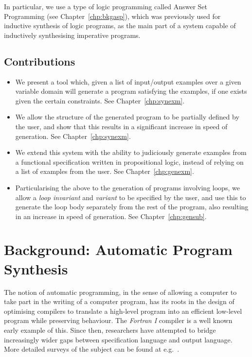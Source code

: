 \documentclass[a4paper,twoside,notitlepage]{report}
\begin{document}
In particular, we use a type of logic programming called Answer Set 
Programming (see Chapter~\ref{chp:bkgasp}), which was previously used for 
inductive synthesis of logic programs, as the main part of a system 
capable of inductively synthesising imperative programs.

\section{Contributions}
\begin{changebar}
\begin{itemize}
    \item We present a tool which, given a list of input/output examples 
    over a given variable domain will generate a program satisfying the
    examples, if one exists given the certain constraints. See 
    Chapter~\ref{chp:synexm}.

    \item We allow the structure of the generated program to be partially 
    defined by the user, and show that this results in a significant increase
    in speed of generation. See Chapter~\ref{chp:synexm}.

    \item We extend this system with the ability to judiciously generate 
    examples from a functional specification written in propositional
    logic, instead of relying on a list of examples from the user. See
    Chapter~\ref{chp:genexm}.

    \item Particularising the above to the generation of programs 
    involving loops, we allow a \emph{loop invariant} and \emph{variant}
    to be specified by the user, and use this to generate the loop body
    separately from the rest of the program, also resulting in an 
    increase in speed of generation. See Chapter~\ref{chp:gensub}.
\end{itemize}
\end{changebar}

\chapter{Background: Automatic Program Synthesis} \label{chp:bkgsyn}

The notion of automatic programming, in the sense of 
allowing a computer to take part in the writing of a computer program, has its 
roots in the design of optimising compilers to translate a high-level program 
into an efficient low-level program while preserving behaviour. The 
\emph{Fortran I} compiler\cite{fortran} is a well known early example of this. 
Since then, researchers have attempted to bridge increasingly wider gaps 
between specification language and output language. More detailed surveys of 
the subject can be found at e.g.\ 
\cite{goldberg86}\cite{deville94}\cite{basin04}.
\end{document}
